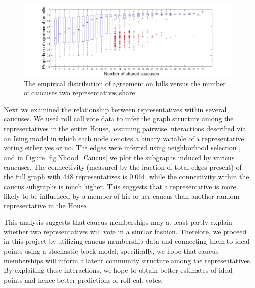\documentclass{article}
\begin{document}
\begin{figure}[h]
  \centering
        \includegraphics[width=\textwidth]{Caucus_vs_Votes.jpg}
  \caption{The empirical distribution of agreement on bills versus the number of caucuses two representatives share.}%
          \label{fig:VotesVsCaucus}
\end{figure}


Next we examined the relationship between representatives within several caucuses. We used roll call vote data to infer the graph structure among the representatives in the entire House, assuming pairwise interactions described via an Ising model in which each node denotes a binary variable of a representative voting either yes or no. The edges were inferred using neighborhood selection \cite{Hastie2015}, and in Figure \ref{fig:Nhood_Caucus} we plot the subgraphs induced by various caucuses. The connectivity (measured by the fraction of total edges present) of the full graph with 448 representatives is 0.064, while the connectivity within the caucus subgraphs is much higher. This suggests that a representative is more likely to be influenced by a member of his or her caucus than another random representative in the House.\par

This analysis suggests that caucus memberships may at least partly explain whether two representatives will vote in a similar fashion. Therefore, we proceed in this project by utilizing caucus membership data and connecting them to ideal points using a stochastic block model; specifically, we hope that caucus memberships will inform a latent community structure among the representatives. By exploiting these interactions, we hope to obtain better estimates of ideal points and hence better predictions of roll call votes. 
\end{document}
